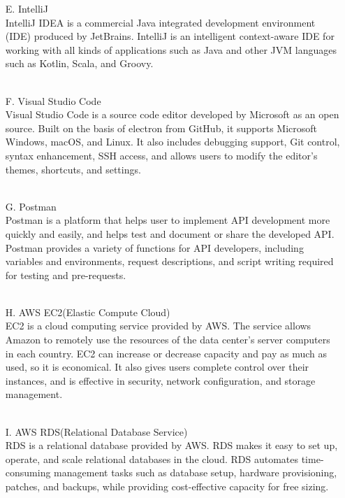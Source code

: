 \documentclass[conference]{IEEEtran}
\begin{document}
\begin{itemize}
\\
\item [E.] IntelliJ\\
IntelliJ IDEA is a commercial Java integrated development environment (IDE) produced by JetBrains. IntelliJ is an intelligent context-aware IDE for working with all kinds of applications such as Java and other JVM languages such as Kotlin, Scala, and Groovy.\\
\\
\item [F.] Visual Studio Code\\
Visual Studio Code is a source code editor developed by Microsoft as an open source. Built on the basis of electron from GitHub, it supports Microsoft Windows, macOS, and Linux. It also includes debugging support, Git control, syntax enhancement, SSH access, and allows users to modify the editor's themes, shortcuts, and settings.\\
\\
\item [G.] Postman\\
Postman is a platform that helps user to implement API development more quickly and easily, and helps test and document or share the developed API. Postman provides a variety of functions for API developers, including variables and environments, request descriptions, and script writing required for testing and pre-requests.\\
\\
\item [H.] AWS EC2(Elastic Compute Cloud)\\
EC2 is a cloud computing service provided by AWS. The service allows Amazon to remotely use the resources of the data center's server computers in each country. EC2 can increase or decrease capacity and pay as much as used, so it is economical. It also gives users complete control over their instances, and is effective in security, network configuration, and storage management.\\
\\
\item [I.] AWS RDS(Relational Database Service)\\
RDS is a relational database provided by AWS. RDS makes it easy to set up, operate, and scale relational databases in the cloud. RDS automates time-consuming management tasks such as database setup, hardware provisioning, patches, and backups, while providing cost-effective capacity for free sizing.\\
\\

\end{itemize}
\end{document}
